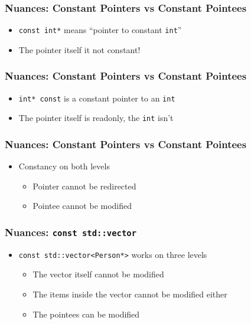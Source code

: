 \begin{frame}
  \frametitle{Nuances: Constant Pointers vs Constant Pointees}
  \begin{itemize}
    \item \texttt{const int*} means ``pointer to constant \texttt{int}''
    \item The pointer itself it not constant!
  \end{itemize}
\end{frame}

\begin{frame}
  \frametitle{Nuances: Constant Pointers vs Constant Pointees}
  \begin{itemize}
    \item \texttt{int* const} is a constant pointer to an \texttt{int}
    \item The pointer itself is readonly, the \texttt{int} isn't
  \end{itemize}
\end{frame}

\begin{frame}
  \frametitle{Nuances: Constant Pointers vs Constant Pointees}
  \begin{itemize}
    \item Constancy on both levels
          \begin{itemize}
            \item Pointer cannot be redirected
            \item Pointee cannot be modified
          \end{itemize}
  \end{itemize}
\end{frame}

\begin{frame}
  \frametitle{Nuances: \texttt{const std::vector}}
  \begin{itemize}
    \item \texttt{const std::vector<Person*>} works on three levels
          \begin{itemize}
            \item The vector itself cannot be modified
            \item The items inside the vector cannot be modified either
            \item The pointees can be modified
          \end{itemize}
  \end{itemize}
  \vskip5mm
  \begin{overprint}



  \end{overprint}
\end{frame}





